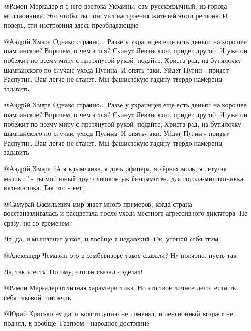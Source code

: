 \begin{itemize}
\begin{itemize}

@Рамон Меркадер  я с юго-востока Украины, сам русскоязычный, из
города-миллионника. Это чтобы ты понимал настроения жителей этого региона. И
поверь, эти настроения здесь преобладающие


@Андрiй Хмара  Однако странно... Разве у украинцев еще есть деньги на хорошее
шампанское? Впрочем, о чем это я? Скинут Левинского, придет другой. И уже он
побежит по всему миру с протянутой рукой: подайте, Христа рад, на бутылочку
шампанского по случаю ухода Путина!  И опять-таки. Уйдет Путин - придет
Распутин. Вам легче не станет. Мы фашистскую гадину твердо намерены задавить.


@Андрiй Хмара  Однако странно... Разве у украинцев еще есть деньги на хорошее
шампанское? Впрочем, о чем это я? Скинут Левинского, придет другой. И уже он
побежит по всему миру с протянутой рукой: подайте, Христа рад, на бутылочку
шампанского по случаю ухода Путина!  И опять-таки. Уйдет Путин - придет
Распутин. Вам легче не станет. Мы фашистскую гадину твердо намерены задавить.


@Андрiй Хмара  \enquote{А я крымчанка, я дочь офицера, я чёрная моль, я летучая
мышь...} - ты мой юный друг слишком уж безграмотен, для города-миллионника
юго-востока. Так что - нет.


@Самурай Васильевич  мир знает много примеров, когда страна восстанавливалась
и расцветала после ухода местного агрессивного диктатора. Не сразу, но со
временем.

Да, да, и мышление узкое, и вообще я недалёкий. Ок, утешай себя этим


@Александр Чемарин  это в зомбовизоре такое сказали? Ну понятно, пусть так


Да, так и есть! Потому, что он сказал - зделал!


@Рамон Меркадер  отличная характеристика. Но это твоё личное дело, если ты
себя таковой считаешь


@Юрий Крисько  ну да, и конституцию не поменял, и пенсионный возраст не
поднял, и вообще, Газпром - народное достояние


\end{itemize}
\end{itemize}
